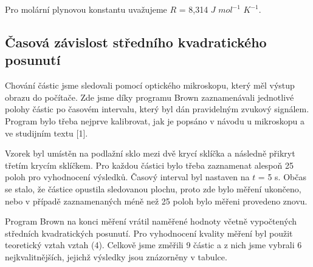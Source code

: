 Pro molární plynovou konstantu uvažujeme \(R\) = 8,314 $J$ ${mol}^{-1}$ $K^{-1}$.

\subsection{Časová závislost středního kvadratického posunutí}

Chování částic jsme sledovali pomocí optického mikroskopu, který měl výstup obrazu do počítače. Zde jsme díky programu Brown zaznamenávali jednotlivé polohy částic po časovém intervalu, který byl dán pravidelným zvukový signálem. Program bylo třeba nejprve kalibrovat, jak je popsáno v návodu u mikroskopu a ve studijním textu [1].

Vzorek byl umístěn na podlažní sklo mezi dvě krycí sklíčka a následně přikryt třetím krycím sklíčkem. Pro každou částici bylo třeba zaznamenat alespoň 25 poloh pro vyhodnocení výsledků. Časový interval byl nastaven na \(t\) = 5 s. Občas se stalo, že částice opustila sledovanou plochu, proto zde bylo měření ukončeno, nebo v případě zaznamenaných méně než 25 poloh bylo měřeni provedeno znovu.

Program Brown na konci měření vrátil naměřené hodnoty včetně vypočtených středních kvadratických posunutí. Pro vyhodnocení kvality měření byl použit teoretický vztah vztah (4). Celkově jsme změřili 9 částic a z nich jsme vybrali 6 nejkvalitnějších, jejichž výsledky jsou znázorněny v tabulce.

